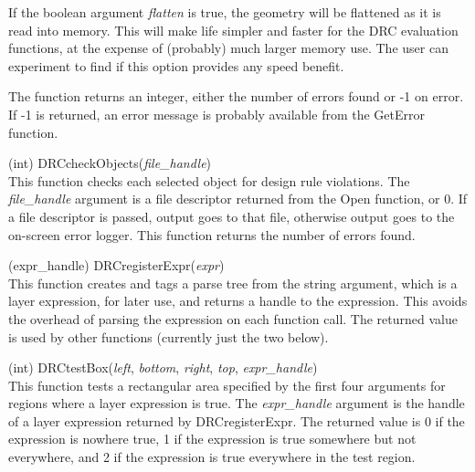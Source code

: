 \begin{description}
If the boolean argument {\it flatten} is true, the geometry will be
flattened as it is read into memory.  This will make life simpler and
faster for the DRC evaluation functions, at the expense of (probably)
much larger memory use.  The user can experiment to find if this
option provides any speed benefit.

The function returns an integer, either the number of errors found or
-1 on error.  If -1 is returned, an error message is probably
available from the {\vt GetError} function.

\item{(int) \vt DRCcheckObjects({\it file\_handle\/})}\\
This function checks each selected object for design rule violations. 
The {\it file\_handle\/} argument is a file descriptor returned from
the {\vt Open} function, or 0.  If a file descriptor is passed, output
goes to that file, otherwise output goes to the on-screen error
logger.  This function returns the number of errors found.

\item{(expr\_handle) \vt DRCregisterExpr({\it expr\/})}\\
This function creates and tags a parse tree from the string argument,
which is a layer expression, for later use, and returns a handle to
the expression.  This avoids the overhead of parsing the expression on
each function call.  The returned value is used by other functions
(currently just the two below).

\item{(int) \vt DRCtestBox({\it left\/}, {\it bottom\/}, {\it right\/},
 {\it top\/}, {\it expr\_handle\/})}\\
This function tests a rectangular area specified by the first four
arguments for regions where a layer expression is true.  The {\it
expr\_handle\/} argument is the handle of a layer expression returned
by {\vt DRCregisterExpr}.  The returned value is 0 if the expression
is nowhere true, 1 if the expression is true somewhere but not
everywhere, and 2 if the expression is true everywhere in the test
region.


\end{description}
